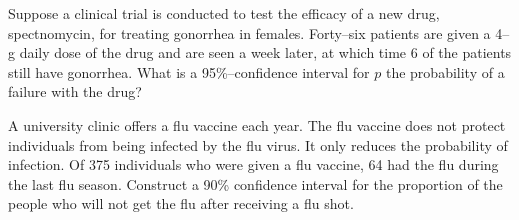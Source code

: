 


\begin{problem} %
Suppose a clinical trial is conducted to test the efficacy of a new
drug, spectnomycin, for treating gonorrhea in females. Forty--six
patients are given a 4--g daily dose of the drug and are seen a week
later, at which time 6 of the patients still have gonorrhea. What is a
95\%--confidence interval for $p$ the probability of a failure with
the drug?

\end{problem}

\begin{problem} %
  A university clinic offers a flu vaccine each year. The flu vaccine
  does not protect individuals from being infected by the flu
  virus. It only reduces the probability of infection. Of 375
  individuals who were given a flu vaccine, 64 had the flu during the
  last flu season. Construct a 90\% confidence interval for the
  proportion of the people who will not get the flu after receiving a
  flu shot.

\end{problem}
